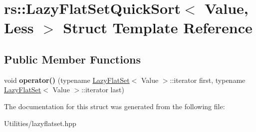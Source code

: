 \hypertarget{structrs_1_1_lazy_flat_set_quick_sort}{\section{rs\+:\+:Lazy\+Flat\+Set\+Quick\+Sort$<$ Value, Less $>$ Struct Template Reference}
\label{structrs_1_1_lazy_flat_set_quick_sort}
}
\subsection*{Public Member Functions}
\begin{DoxyCompactItemize}
\item 
\hypertarget{structrs_1_1_lazy_flat_set_quick_sort_a6589a914256756b7cd152cdf2c0f2cef}{void {\bfseries operator()} (typename \hyperlink{classrs_1_1_lazy_flat_set}{Lazy\+Flat\+Set}$<$ Value $>$\+::iterator first, typename \hyperlink{classrs_1_1_lazy_flat_set}{Lazy\+Flat\+Set}$<$ Value $>$\+::iterator last)}\label{structrs_1_1_lazy_flat_set_quick_sort_a6589a914256756b7cd152cdf2c0f2cef}

\end{DoxyCompactItemize}


The documentation for this struct was generated from the following file\+:\begin{DoxyCompactItemize}
\item 
Utilities/lazyflatset.\+hpp\end{DoxyCompactItemize}
